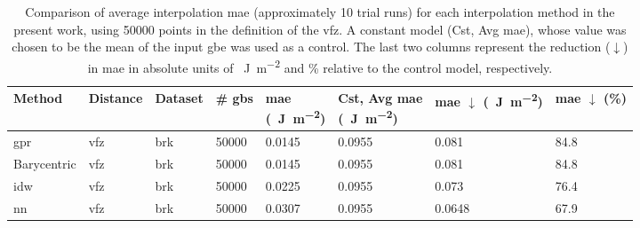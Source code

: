 \documentclass[final,twocolumn,12pt]{elsarticle}
\newcommand{\inpt}{input}
\begin{document}
\begin{table}
\centering
\caption{Comparison of average interpolation \gls{mae} (approximately 10 trial runs) for each interpolation method in the present work, using \num{50000} points in the definition of the \gls{vfz}. A constant model (Cst, Avg \gls{mae}), whose value was chosen to be the mean of the \inpt{} \gls{gbe} was used as a control. The last two columns represent the reduction ($\downarrow$) in \gls{mae} in absolute units of \SI{}{\J\per\square\meter} and \% relative to the control model, respectively.}
\label{tab:mae-error-comparison}
\begin{tabular}{@{}llllllll@{}}
\toprule
Method &
  Distance &
  Dataset &
  \# \glspl{gb} &
  \thead{\gls{mae} \\   (\SI{}{\J\per\square\meter})} &
  \thead{Cst, Avg \gls{mae} \\   (\SI{}{\J\per\square\meter})} &
  \thead{\gls{mae} $\downarrow$ \\   (\SI{}{\J\per\square\meter})} &
  \thead{\gls{mae}   $\downarrow$ \\ (\%)} \\ \midrule
\gls{gpr}   & \acrshort{vfz} & \acrshort{brk} & \num{50000} & \num{0.0145} & \num{0.0955} & \num{0.081}  & \num{84.8} \\
Barycentric & \acrshort{vfz} & \acrshort{brk} & \num{50000} & \num{0.0145} & \num{0.0955} & \num{0.081}  & \num{84.8} \\
\gls{idw}   & \acrshort{vfz} & \acrshort{brk} & \num{50000} & \num{0.0225} & \num{0.0955} & \num{0.073}  & \num{76.4} \\
\gls{nn}    & \acrshort{vfz} & \acrshort{brk} & \num{50000} & \num{0.0307} & \num{0.0955} & \num{0.0648} & \num{67.9} \\ \bottomrule
\end{tabular}
\end{table}
\end{document}
